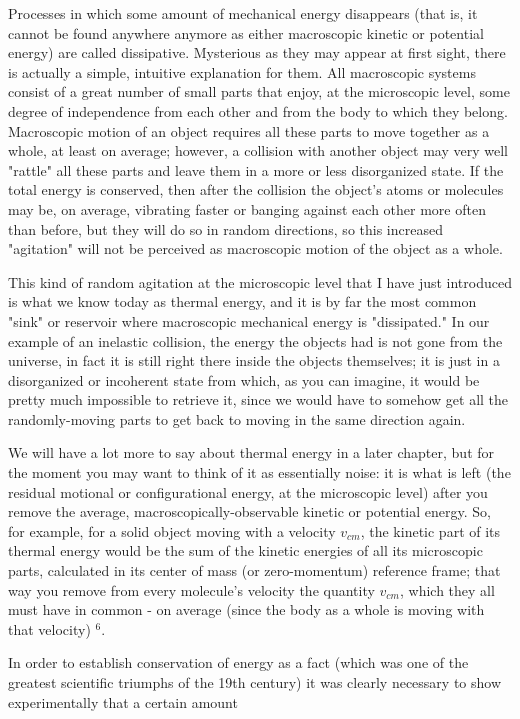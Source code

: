 \documentclass[10pt]{article}
\begin{document}
Processes in which some amount of mechanical energy disappears (that is, it cannot be found anywhere anymore as either macroscopic kinetic or potential energy) are called dissipative. Mysterious as they may appear at first sight, there is actually a simple, intuitive explanation for them. All macroscopic systems consist of a great number of small parts that enjoy, at the microscopic level, some degree of independence from each other and from the body to which they belong. Macroscopic motion of an object requires all these parts to move together as a whole, at least on average; however, a collision with another object may very well "rattle" all these parts and leave them in a more or less disorganized state. If the total energy is conserved, then after the collision the object's atoms or molecules may be, on average, vibrating faster or banging against each other more often than before, but they will do so in random directions, so this increased "agitation" will not be perceived as macroscopic motion of the object as a whole.

This kind of random agitation at the microscopic level that I have just introduced is what we know today as thermal energy, and it is by far the most common "sink" or reservoir where macroscopic mechanical energy is "dissipated." In our example of an inelastic collision, the energy the objects had is not gone from the universe, in fact it is still right there inside the objects themselves; it is just in a disorganized or incoherent state from which, as you can imagine, it would be pretty much impossible to retrieve it, since we would have to somehow get all the randomly-moving parts to get back to moving in the same direction again.

We will have a lot more to say about thermal energy in a later chapter, but for the moment you may want to think of it as essentially noise: it is what is left (the residual motional or configurational energy, at the microscopic level) after you remove the average, macroscopically-observable kinetic or potential energy. So, for example, for a solid object moving with a velocity $v_{c m}$, the kinetic part of its thermal energy would be the sum of the kinetic energies of all its microscopic parts, calculated in its center of mass (or zero-momentum) reference frame; that way you remove from every molecule's velocity the quantity $v_{c m}$, which they all must have in common - on average (since the body as a whole is moving with that velocity) ${ }^{6}$.

In order to establish conservation of energy as a fact (which was one of the greatest scientific triumphs of the 19th century) it was clearly necessary to show experimentally that a certain amount
\end{document}
